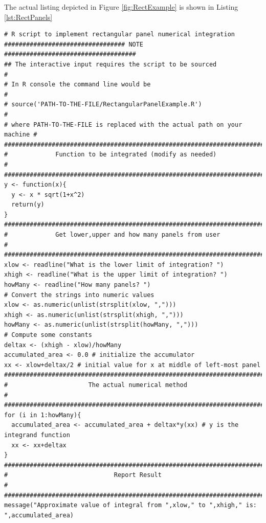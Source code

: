 The actual listing depicted in Figure \ref{fig:RectExample} is shown in Listing \ref{lst:RectPanels}

\begin{lstlisting}[caption=R code demonstrating Rectangular Panel Numerical Integration, label=lst:RectPanels]
# R script to implement rectangular panel numerical integration
################################# NOTE ####################################
## The interactive input requires the script to be sourced                #
# In R console the command line would be                                  #
# source('PATH-TO-THE-FILE/RectangularPanelExample.R')                    #
# where PATH-TO-THE-FILE is replaced with the actual path on your machine #
###########################################################################
#             Function to be integrated (modify as needed)                #
###########################################################################
y <- function(x){
  y <- x * sqrt(1+x^2)
  return(y)
}
###########################################################################
#             Get lower,upper and how many panels from user               #
###########################################################################
xlow <- readline("What is the lower limit of integration? ")  
xhigh <- readline("What is the upper limit of integration? ")
howMany <- readline("How many panels? ")
# Convert the strings into numeric values
xlow <- as.numeric(unlist(strsplit(xlow, ",")))
xhigh <- as.numeric(unlist(strsplit(xhigh, ",")))
howMany <- as.numeric(unlist(strsplit(howMany, ",")))
# Compute some constants
deltax <- (xhigh - xlow)/howMany  
accumulated_area <- 0.0 # initialize the accumulator
xx <- xlow+deltax/2 # initial value for x at middle of left-most panel
##########################################################################
#                      The actual numerical method                       #
##########################################################################
for (i in 1:howMany){
  accumulated_area <- accumulated_area + deltax*y(xx) # y is the integrand function
  xx <- xx+deltax
}
##########################################################################
#                             Report Result                              #
##########################################################################
message("Approximate value of integral from ",xlow," to ",xhigh," is: ",accumulated_area)
\end{lstlisting}

